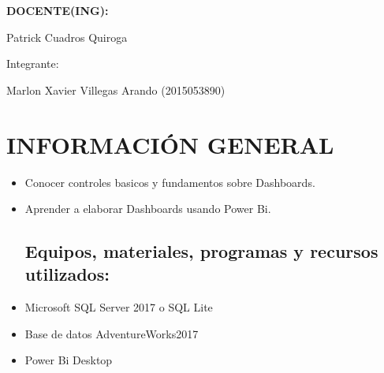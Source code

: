 \documentclass[12pt,letterpaper]{article}
\begin{document}
\begin{titlepage}
\begin{center}
\vspace*{0.3in}
\begin{Large}
\textbf{DOCENTE(ING):} \\
\end{Large}

\vspace*{0.1in}
\begin{large}
 Patrick Cuadros Quiroga\\
\end{large}

\vspace*{0.2in}
\vspace*{0.1in}
\begin{large}
Integrante: \\
\begin{flushleft}
Marlon Xavier Villegas Arando	\hfill	(2015053890) 
\end{flushleft}
\end{large}
\end{center}

\end{titlepage}



\thispagestyle{empty} %
\newpage
\setcounter{page}{1} %

\section{INFORMACIÓN GENERAL}
	\begin{itemize}
\subsection{Objetivos:}
	\item Conocer controles basicos y fundamentos sobre Dashboards.
	\item Aprender a elaborar Dashboards usando Power Bi.
\subsection{Equipos, materiales, programas y recursos utilizados:}
	\item Microsoft SQL Server 2017 o SQL Lite
	\item Base de datos AdventureWorks2017
	\item Power Bi Desktop
\end{itemize}
\end{document}
